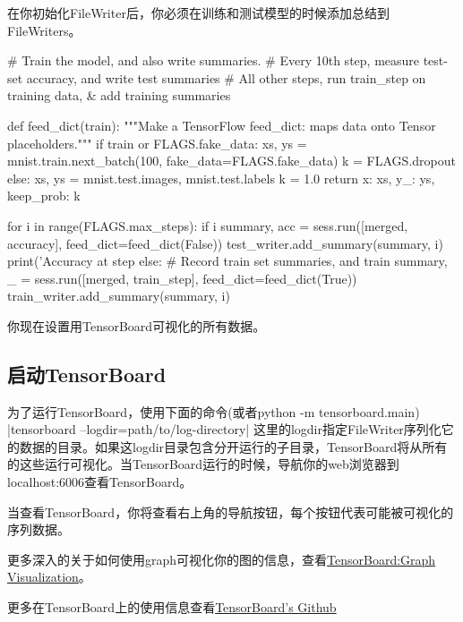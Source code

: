  在你初始化FileWriter后，你必须在训练和测试模型的时候添加总结到FileWriters。
 \begin{pythoncode}
 # Train the model, and also write summaries.
 # Every 10th step, measure test-set accuracy, and write test summaries
 # All other steps, run train_step on training data, & add training summaries
 
 def feed_dict(train):
   """Make a TensorFlow feed_dict: maps data onto Tensor placeholders."""
   if train or FLAGS.fake_data:
     xs, ys = mnist.train.next_batch(100, fake_data=FLAGS.fake_data)
     k = FLAGS.dropout
   else:
     xs, ys = mnist.test.images, mnist.test.labels
     k = 1.0
   return {x: xs, y_: ys, keep_prob: k}
 
 for i in range(FLAGS.max_steps):
   if i %
     summary, acc = sess.run([merged, accuracy], feed_dict=feed_dict(False))
     test_writer.add_summary(summary, i)
     print('Accuracy at step %
   else:  # Record train set summaries, and train
     summary, _ = sess.run([merged, train_step], feed_dict=feed_dict(True))
     train_writer.add_summary(summary, i)
 \end{pythoncode}
 你现在设置用TensorBoard可视化的所有数据。
 \subsection{启动TensorBoard}
 为了运行TensorBoard，使用下面的命令(或者python -m tensorboard.main)
 |tensorboard --logdir=path/to/log-directory|
 这里的logdir指定FileWriter序列化它的数据的目录。如果这logdir目录包含分开运行的子目录，TensorBoard将从所有的这些运行可视化。当TensorBoard运行的时候，导航你的web浏览器到localhost:6006查看TensorBoard。
 
 当查看TensorBoard，你将查看右上角的导航按钮，每个按钮代表可能被可视化的序列数据。
 
 更多深入的关于如何使用graph可视化你的图的信息，查看\href{https://www.tensorflow.org/programmers_guide/graph_viz}{TensorBoard:Graph Visualization}。
 
 更多在TensorBoard上的使用信息查看\href{https://github.com/tensorflow/tensorboard}{TensorBoard's Github}
 
 


